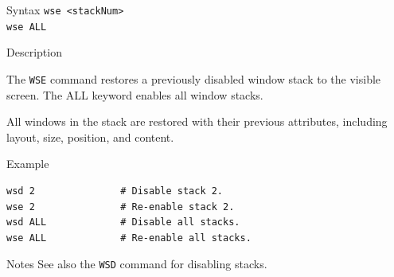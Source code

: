 %
%
\pagebreak
{}

\begin{iPageDescEntry}{Syntax}
\texttt{wse <stackNum> } \\
\texttt{wse ALL }
\end{iPageDescEntry}

\begin{iPageDescEntry}{Description}

The \texttt{WSE} command restores a previously disabled window
stack to the visible screen. The ALL keyword enables all window stacks.

All windows in the stack are restored with their previous attributes, including layout, size, position, and content.  

\end{iPageDescEntry}

\begin{iPageDescOpEntry}{Example}
\begin{lstlisting}[style=iPageOpStyle]
wsd 2               # Disable stack 2.
wse 2               # Re-enable stack 2.
wsd ALL             # Disable all stacks.
wse ALL             # Re-enable all stacks.
\end{lstlisting}
\end{iPageDescOpEntry}

\begin{iPageDescEntry}{Notes}
See also the \texttt{WSD} command for disabling stacks.
\end{iPageDescEntry}
